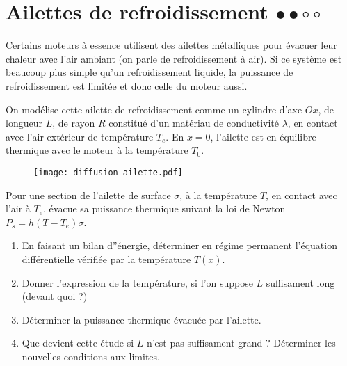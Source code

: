 \newpage

\section{Ailettes de refroidissement $\bullet\bullet\circ\circ$}

Certains moteurs à essence utilisent des ailettes métalliques pour évacuer leur chaleur avec l'air ambiant (on parle de refroidissement à air). Si ce système est beaucoup plus simple qu'un refroidissement liquide, la puissance de refroidissement est limitée et donc celle du moteur aussi.

On modélise cette ailette de refroidissement comme un cylindre d'axe $Ox$, de longueur $L$, de rayon $R$ constitué d'un matériau de conductivité $\lambda$, en contact avec l'air extérieur de température $T_e$. En $x=0$, l'ailette est en équilibre thermique avec le moteur à la température $T_0$. 

\begin{figure}[h!]
\centering
  \texttt{[image: diffusion\_ailette.pdf]}
\end{figure}

Pour une section de l'ailette de surface $\sigma$, à la température $T$, en contact avec l'air à $T_e$, évacue sa puissance thermique suivant la loi de Newton $P_s=h(T-T_e)\sigma$.

\begin{enumerate}

	\item En faisant un bilan d''énergie, déterminer en régime permanent l'équation différentielle vérifiée par la température $T(x)$.
	
	\item Donner l'expression de la température, si l'on suppose $L$ suffisament long (devant quoi ?)
	
	\item Déterminer la puissance thermique évacuée par l'ailette.
	
	\item Que devient cette étude si $L$ n'est pas suffisament grand ? Déterminer les nouvelles conditions aux limites.

\end{enumerate}

\newpage


